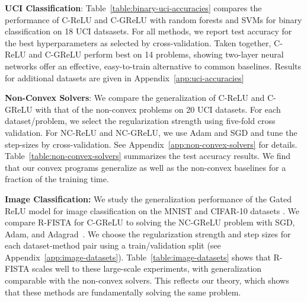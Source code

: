 

\textbf{UCI Classification}:
Table~\ref{table:binary-uci-accuracies} compares the performance of C-ReLU and C-GReLU
with random forests \citep{breiman2001randomforests} and SVMs \citep{boser1992svm} for binary classification on 18 UCI datsasets.
For all methods, we report test accuracy for the best hyperparameters as selected
by cross-validation.
Taken together, C-ReLU and C-GReLU perform best on 14 problems,
showing two-layer neural networks offer an effective, easy-to-train
alternative to common baselines.
Results for additional datasets are given in Appendix~\ref{app:uci-accuracies}

\textbf{Non-Convex Solvers}:
We compare the generalization of C-ReLU and C-GReLU with that of the non-convex problems on 20 UCI datasets.
For each dataset/problem, we select the regularization strength using five-fold cross validation.
For NC-ReLU and NC-GReLU, we use Adam and SGD and tune the step-sizes by cross-validation.
See Appendix~\ref{app:non-convex-solvers} for details.
Table~\ref{table:non-convex-solvers} summarizes the test accuracy results.
We find that our convex programs generalize as well as the non-convex baselines for a fraction of the training time.



\textbf{Image Classification:}
We study the generalization performance of the Gated ReLU model for image classification on the MNIST and CIFAR-10 datasets \citep{lecun1998gradient, krizhevsky2009learning}.
We compare R-FISTA for C-GReLU to solving the NC-GReLU problem with SGD, Adam, and Adagrad~\citep{duchi2011adagrad}.
We choose the regularization strength and step sizes for each dataset-method pair using a train/validation split (see Appendix~\ref{app:image-datasets}).
Table~\ref{table:image-datasets} shows that R-FISTA scales well to these large-scale experiments, with generalization comparable with the non-convex solvers.
This reflects our theory, which shows that these methods are fundamentally solving the same problem.




